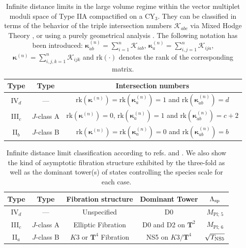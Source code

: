 \begin{table}[h!!]\begin{center}
	\renewcommand{\arraystretch}{0.80}
		\begin{tabular}{|c|c|c|}
		\hline 
		Type \cite{Corvilain:2018lgw} & Type \cite{Lee:2019wij} & Intersection numbers \\
		\hline 
		\hline 
		IV$_d$ & --- & $\text{rk}(\boldsymbol{\kappa}^{(n)}) = \text{rk}(\boldsymbol{\kappa}^{(n)}_a)= 1$ and $\text{rk}(\boldsymbol{\kappa}^{(n)}_{a b})=d$   \\
		III$_c$ & $J$-class A & $\text{rk}(\boldsymbol{\kappa}^{(n)}) = 0$, $\text{rk}(\boldsymbol{\kappa}^{(n)}_a)= 1$ and $\text{rk}(\boldsymbol{\kappa}^{(n)}_{a b})=c+2$ \\
		II$_b$ & $J$-class B & $\text{rk}(\boldsymbol{\kappa}^{(n)}) = \text{rk}(\boldsymbol{\kappa}^{(n)}_a)= 0$ and $\text{rk}(\boldsymbol{\kappa}^{(n)}_{a b})=b$ \\
		\hline
	\end{tabular}
\caption{\small Infinite distance limits in the large volume regime within the vector multiplet moduli space of Type IIA compactified on a CY$_3$. They can be classified in terms of the behavior of the triple intersection numbers $\mathcal{K}_{abc}$ via Mixed Hodge Theory \cite{Corvilain:2018lgw}, or using a purely geometrical analysis \cite{Lee:2019wij}. The following notation has been introduced: $\boldsymbol{\kappa}^{(n)}_{a b} = \sum_{i=1}^n \mathcal{K}_{i a b}$, $\boldsymbol{\kappa}^{(n)}_{a} = \sum_{i,j=1}^n \mathcal{K}_{i j a}$, $\boldsymbol{\kappa}^{(n)} = \sum_{i,j,k=1}^n \mathcal{K}_{i j k}$ and $\text{rk}(\cdot)$ denotes the rank of the corresponding matrix.}
\label{tab:intersN=2}
\end{center}
\end{table}
\begin{table}[h!!]\begin{center}
\renewcommand{\arraystretch}{1.00}
	\begin{tabular}{|c|c|c|c|c|}
		\hline
		Type \cite{Corvilain:2018lgw} & Type \cite{Lee:2019wij} &  Fibration structure  &  Dominant Tower & $\Lambda_{\text{sp}}$\\
		\hline 
		\hline 
		IV$_d$ & --- & Unspecified  & D0 & $M_{\text{Pl};\, 5}$\\
		III$_c$  & $J$-class A & Elliptic Fibration & D0 and D2 on $\mathbf{T}^2$ & $M_{\text{Pl};\, 6}$\\
		II$_a$ & $J$-class B & $K3$ or $\mathbf{T}^4$ Fibration & NS5 on $K3/\mathbf{T}^4$ & $\sqrt{T_{\rm NS5}}$\\
		\hline
	\end{tabular}
	\caption{\small Infinite distance limit classification according to refs. \cite{Corvilain:2018lgw} and \cite{Lee:2019wij}. We also show the kind of asymptotic fibration structure exhibited by the three-fold as well as the dominant tower(s) of states controlling the species scale for each case.}
	\label{tab:limitsN=2}
\end{center}
\end{table}
	
